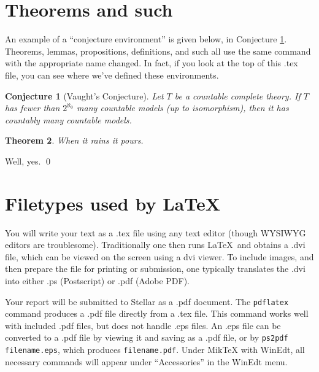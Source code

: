 \documentclass[12pt]{amsart}   %
\newtheorem{theorem}{Theorem}[section]
\newtheorem{conjecture}[theorem]{Conjecture}
\begin{document}

\section{Theorems and such}

An example of a ``conjecture environment'' is given below, in Conjecture
\ref{conj:vaught}.  Theorems, lemmas, propositions, definitions, and
such all use the same command with the appropriate name changed.
In fact, if you look at the top of this .tex file, you can see where we've defined
these environments.

\begin{conjecture}[Vaught's Conjecture]\label{conj:vaught}
Let $T$ be a countable complete theory.  If $T$ has fewer than
$2^{\aleph_0}$ many countable models (up to isomorphism), then it has
countably many countable models.
\end{conjecture}

\begin{theorem}
When it rains it pours.
\end{theorem}

\proof Well, yes. \qed



\section{Filetypes used by LaTeX \label{sec:files}}

You will write your text as a .tex file using any text editor (though WYSIWYG 
editors are troublesome).
Traditionally one then runs \LaTeX\ and obtains a .dvi file, which
can be viewed on the screen using a dvi viewer. To include images, and then prepare the file for printing or submission,
one typically translates the .dvi into either .ps (Postscript) or .pdf (Adobe PDF).

Your report will be submitted to Stellar as a .pdf document.
The {\tt pdflatex} command
produces a .pdf file directly from a .tex file. This command works well with 
included .pdf files, but does not handle .eps files. 
An .eps file can be converted to a .pdf file by viewing it 
and saving as a .pdf file, or by {\tt ps2pdf filename.eps}, which produces
{\tt filename.pdf}.
Under MikTeX with WinEdt, all necessary commands will appear under ``Accessories'' in the WinEdt menu. 
\end{document}
